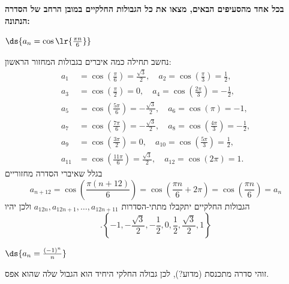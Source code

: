 \textbf{בכל אחד מהסעיפים הבאים, מצאו את כל הגבולות החלקיים במובן הרחב של הסדרה הנתונה:}
\bE{}
 \item $\ds{a_n=\cos\lr{\frac{\pi n}{6}}}$
\begin{solbox}
נחשב תחילה כמה איברים בגבולות המחזור הראשון:
\[
\begin{aligned}
a_1  &= \cos\left(\frac{\pi}{6}\right)  = \frac{\sqrt{3}}{2},\quad
a_2  = \cos\left(\frac{\pi}{3}\right)  = \frac12,\\
a_3  &= \cos\left(\frac{\pi}{2}\right)  = 0,\quad
a_4  = \cos\left(\frac{2\pi}{3}\right) = -\frac12,\\
a_5  &= \cos\left(\frac{5\pi}{6}\right) = -\frac{\sqrt{3}}{2},\quad
a_6  = \cos(\pi)                      = -1,\\
a_7  &= \cos\left(\frac{7\pi}{6}\right) = -\frac{\sqrt{3}}{2},\quad
a_8  = \cos\left(\frac{4\pi}{3}\right) = -\frac12,\\
a_9  &= \cos\left(\frac{3\pi}{2}\right) = 0,\quad
a_{10} = \cos\left(\frac{5\pi}{3}\right)  = \frac12,\\
a_{11} &= \cos\left(\frac{11\pi}{6}\right) = \frac{\sqrt{3}}{2},\quad
a_{12} = \cos(2\pi)                     = 1.
\end{aligned}
\]
בגלל שאיברי הסדרה מחזוריים
$$a_{n+12}=\cos\left(
\frac{\pi(n+12)}{6}\right)=\cos\left(
\frac{\pi n}{6}+2\pi\right)=\cos\left(
\frac{\pi n}{6}\right)=a_n$$
הגבולות החלקיים יתקבלו מתתי-הסדרות
$a_{12n},a_{12n+1},\ldots,a_{12n+11}$
ולכן יהיו
 $$.\left\{-1,-\frac{\sqrt{3}}{2},-\frac{1}{2},0,\frac{1}{2},\frac{\sqrt{3}}{2},1\right\}$$
\end{solbox}
 \item $\ds{a_n=\frac{(-1)^n}{n}}$
 \begin{solbox}
זוהי סדרה מתכנסת (מדוע?), לכן גבולה החלקי היחיד הוא הגבול שלה שהוא
אפס.
\end{solbox}

